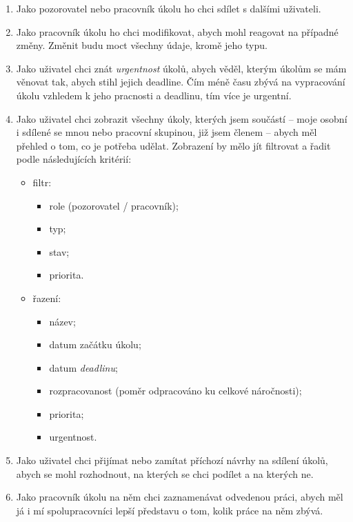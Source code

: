 \documentclass[thesis=B,czech]{FITthesis}[2012/06/26]
\begin{document}
\begin{enumerate}
\begin{enumerate}
				\item Jako pozorovatel nebo pracovník úkolu ho chci sdílet s dalšími uživateli.
				
				\item Jako pracovník úkolu ho chci modifikovat, abych mohl reagovat na případné změny. Změnit budu moct všechny údaje, kromě jeho typu.
				
				\item Jako uživatel chci znát \textit{urgentnost} úkolů, abych věděl, kterým úkolům se mám věnovat tak, abych stihl jejich deadline. Čím méně času zbývá na vypracování úkolu vzhledem k jeho pracnosti a deadlinu, tím více je urgentní.
				
				\item Jako uživatel chci zobrazit všechny úkoly, kterých jsem součástí -- moje osobní i sdílené se mnou nebo pracovní skupinou, již jsem členem -- abych měl přehled o tom, co je potřeba udělat. Zobrazení by mělo jít filtrovat a řadit podle následujících kritérií:
				\begin{itemize}
					\item filtr:
					\begin{itemize}
						\item role (pozorovatel / pracovník);
						\item typ;
						\item stav;
						\item priorita.
					\end{itemize}
					\item řazení:
					\begin{itemize}
						\item název;
						\item datum začátku úkolu;
						\item datum \textit{deadlinu};
						\item rozpracovanost (poměr odpracováno ku celkové náročnosti);
						\item priorita;
						\item urgentnost.
					\end{itemize}
				\end{itemize}
				
				\item Jako uživatel chci přijímat nebo zamítat příchozí návrhy na sdílení úkolů, abych se mohl rozhodnout, na kterých se chci podílet a na kterých ne.
				
				\item Jako pracovník úkolu na něm chci zaznamenávat odvedenou práci, abych měl já i mí spolupracovníci lepší představu o tom, kolik práce na něm zbývá.
				

\end{enumerate}
\end{enumerate}
\end{document}
